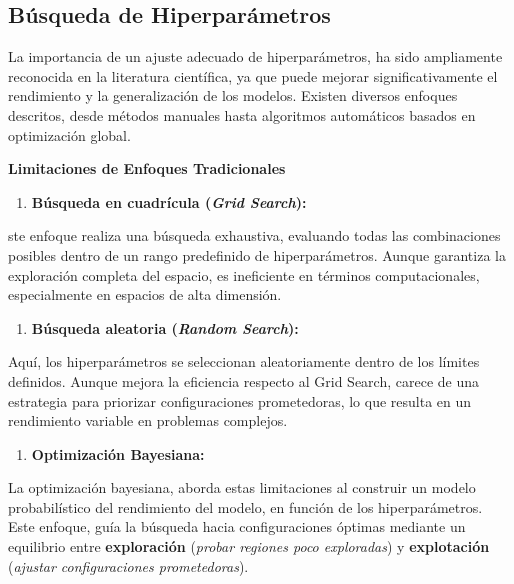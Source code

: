 \documentclass[
  12pt,
  letterpaper,
  DIV=11,
  numbers=noendperiod]{scrartcl}
\providecommand{\tightlist}{%
  \setlength{\itemsep}{0pt}\setlength{\parskip}{0pt}}\usepackage{longtable,booktabs,array}
\begin{document}
\subsection{Búsqueda de
Hiperparámetros}\label{buxfasqueda-de-hiperparuxe1metros}

La importancia de un ajuste adecuado de hiperparámetros, ha sido
ampliamente reconocida en la literatura científica, ya que puede mejorar
significativamente el rendimiento y la generalización de los modelos.
Existen diversos enfoques descritos, desde métodos manuales hasta
algoritmos automáticos basados en optimización global.

\newpage

\textbf{Limitaciones de Enfoques Tradicionales}

\begin{enumerate}
\def\labelenumi{\arabic{enumi}.}
\tightlist
\item
  \textbf{Búsqueda en cuadrícula (\emph{Grid Search}):}
\end{enumerate}

ste enfoque realiza una búsqueda exhaustiva, evaluando todas las
combinaciones posibles dentro de un rango predefinido de
hiperparámetros. Aunque garantiza la exploración completa del espacio,
es ineficiente en términos computacionales, especialmente en espacios de
alta dimensión.

\begin{enumerate}
\def\labelenumi{\arabic{enumi}.}
\setcounter{enumi}{1}
\tightlist
\item
  \textbf{Búsqueda aleatoria (\emph{Random Search}):}
\end{enumerate}

Aquí, los hiperparámetros se seleccionan aleatoriamente dentro de los
límites definidos. Aunque mejora la eficiencia respecto al Grid Search,
carece de una estrategia para priorizar configuraciones prometedoras, lo
que resulta en un rendimiento variable en problemas complejos.

\begin{enumerate}
\def\labelenumi{\arabic{enumi}.}
\setcounter{enumi}{2}
\tightlist
\item
  \textbf{Optimización Bayesiana:}
\end{enumerate}

La optimización bayesiana, aborda estas limitaciones al construir un
modelo probabilístico del rendimiento del modelo, en función de los
hiperparámetros. Este enfoque, guía la búsqueda hacia configuraciones
óptimas mediante un equilibrio entre \textbf{exploración} (\emph{probar
regiones poco exploradas}) y \textbf{explotación} (\emph{ajustar
configuraciones prometedoras}).
\end{document}
